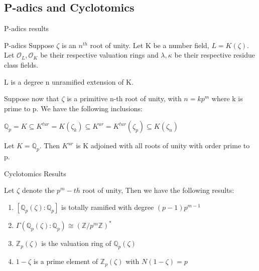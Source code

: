 \documentclass[10pt]{beamer}
\begin{document}
\subsection{P-adics and Cyclotomics}
\begin{frame}{P-adics results}
\begin{block}{P-adics}
Suppose $\zeta$ is an $n^{th}$ root of unity. Let K be a number field, $L=K(\zeta)$. Let $\mathcal{O}_L,\mathcal{O}_K$ be their respective valuation rings and $\lambda,\kappa$ be their respective residue class fields. \begin{proposition}
L is a degree n unramified extension of K.
\end{proposition}

Suppose now that $\zeta$ is a primitive n-th root of unity, with $n=kp^{m}$ where k is prime to p. We have the following inclusions:
\end{block}
\begin{example}
      $\mathbb{Q}_{p}=K\subseteq K^{tur}=K(\zeta_k)\subseteq K^{ur} = K^{tur}(\zeta_{p})\subseteq K(\zeta_n)$
\end{example}
\begin{theorem}
    Let $K=\mathbb{Q}_p$. Then $K^{ur}$ is K adjoined with all roots of unity with order prime to p. 
\end{theorem}

\end{frame}

\begin{frame}{Cyclotomics Results}
    \begin{theorem}
    Let $\zeta$ denote the $p^m-th$ root of unity, 
    Then we have the following results:
    \begin{enumerate}
        \item $[\mathbb{Q}_{p}(\zeta):\mathbb{Q}_p]$ is totally ramified with degree $(p-1)p^{m-1}$
        \item $\Gamma(\mathbb{Q}_{p}(\zeta):\mathbb{Q}_p)\cong (\mathbb{Z}/p^{m}\mathbb{Z})^{*}$
        \item $\mathbb{Z}_{p}(\zeta)$ is the valuation ring of $\mathbb{Q}_{p}(\zeta)$
        \item $1-\zeta$ is a prime element of $\mathbb{Z}_{p}(\zeta)$ with $N(1-\zeta)=p$
    \end{enumerate}
\end{theorem}
\end{frame}
\end{document}
